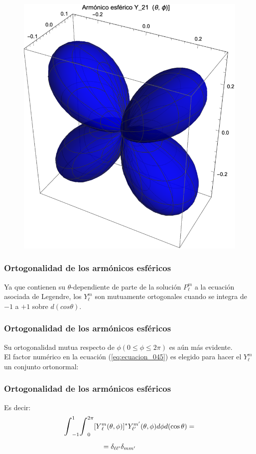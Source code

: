 \documentclass[12pt]{beamer}
\begin{document}
\begin{frame}[plain]
\begin{figure}
    \centering
    \includegraphics[scale=0.65]{Imagenes/Armonicos_Esfericos_21.eps}
\end{figure}
\end{frame}
\begin{frame}
\frametitle{Ortogonalidad de los armónicos esféricos}
Ya que contienen su $\theta$-dependiente de parte de la solución $P_{\ell}^{m}$ a la ecuación asociada de Legendre, \pause los $Y_{\ell}^{m}$ son mutuamente ortogonales cuando se integra de $-1$ a $+1$ sobre $d(cos \theta)$.
\end{frame}
\begin{frame}
\frametitle{Ortogonalidad de los armónicos esféricos}
Su ortogonalidad mutua respecto de $\phi (0 \leq \phi \leq 2 \pi)$ es aún más evidente. 
\\
\bigskip
\pause
El factor numérico en la ecuación (\ref{eq:ecuacion_045}) es elegido para hacer el $Y_{\ell}^{m}$ un conjunto ortonormal:
\end{frame}
\begin{frame}
\frametitle{Ortogonalidad de los armónicos esféricos}
Es decir:
\pause
\begin{equation}
\begin{aligned}[b]
\scaleint{6ex}_{-1}^{1} \scaleint{6ex}_{0}^{2 \pi} [ Y&_{\ell}^{m} (\theta, \phi) ]^{*} Y_{\ell'}^{m'} (\theta, \phi) d \phi d(\cos \theta) = \\[0.5em] 
&= \delta_{\ell \ell'} \delta_{m m'}
\end{aligned}
\label{eq:ecuacion_046}
\end{equation}
\end{frame}
\end{document}
